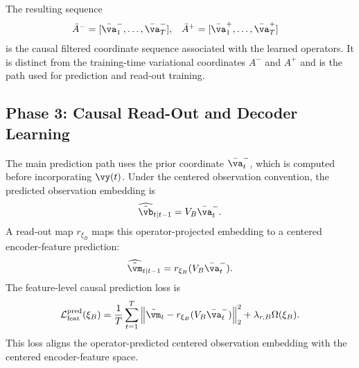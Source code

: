 \documentclass[twoside,11pt]{article}
\begin{document}
The resulting sequence
\begin{align}
\bar A^-
&=
[\bar{\va}_1^-,\dots,\bar{\va}_T^-],
&
\bar A^+
&=
[\bar{\va}_1^+,\dots,\bar{\va}_T^+]
\label{eq:phase2_filtered_paths}
\end{align}
is the causal filtered coordinate sequence associated with the learned
operators. It is distinct from the training-time variational coordinates
$A^-$ and $A^+$ and is the path used for prediction and read-out
training.

\subsection{Phase 3: Causal Read-Out and Decoder Learning}

The main prediction path uses the prior coordinate $\bar{\va}_t^-$,
which is computed before incorporating $\vy(t)$. Under the centered
observation convention, the predicted observation embedding is
\begin{align}
\widehat{\tilde{\vb}}_{t|t-1}
=
V_B\bar{\va}_t^-.
\label{eq:phase3_predicted_embedding}
\end{align}
A read-out map $r_{\xi_B}$ maps this operator-projected embedding to a
centered encoder-feature prediction:
\begin{align}
\widehat{\tilde{\vm}}_{t|t-1}
=
r_{\xi_B}(V_B\bar{\va}_t^-).
\label{eq:phase3_predicted_feature}
\end{align}
The feature-level causal prediction loss is
\begin{align}
\mathcal L_{\mathrm{feat}}^{\mathrm{pred}}(\xi_B)
=
\frac1T
\sum_{t=1}^T
\left\|
\tilde{\vm}_t
-
r_{\xi_B}(V_B\bar{\va}_t^-)
\right\|_2^2
+
\lambda_{r,B}\Omega(\xi_B).
\label{eq:phase3_feature_loss}
\end{align}
This loss aligns the operator-predicted centered observation embedding
with the centered encoder-feature space.
\end{document}
